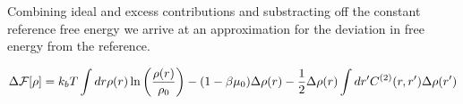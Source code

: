 Combining ideal and excess contributions and substracting off the constant reference free energy we arrive at an approximation for the deviation in free energy from the reference. 

\begin{equation}
    \Delta \mathcal{F} [\rho] = k_b T \int dr \rho(r) \ln\left(\frac{\rho(r)}{\rho_0}\right) -(1-\beta\mu_0) \Delta \rho(r) - \frac{1}{2}\Delta \rho(r) \int dr^\prime C^{(2)}(r, r^\prime) \Delta \rho(r^\prime)
\end{equation}

